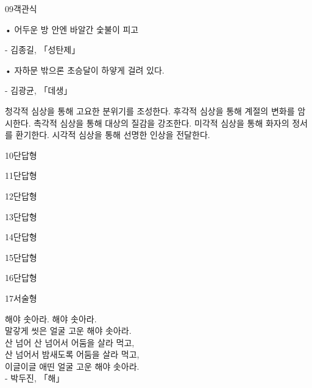 \documentclass[fs9,seriesRus]{korfarm-base}
\begin{document}
\begin{kfQBlock}{09}{객관식}
\begin{kfEvidence}• 어두운 방 안엔 바알간 숯불이 피고

 - 김종길, 「성탄제」

• 자하문 밖으론 초승달이 하얗게 걸려 있다.

 - 김광균, 「데생」\end{kfEvidence}
\begin{kfChoices}
\kfChoice 청각적 심상을 통해 고요한 분위기를 조성한다.
\kfChoice 후각적 심상을 통해 계절의 변화를 암시한다.
\kfChoice 촉각적 심상을 통해 대상의 질감을 강조한다.
\kfChoice 미각적 심상을 통해 화자의 정서를 환기한다.
\kfChoice 시각적 심상을 통해 선명한 인상을 전달한다.
\end{kfChoices}
\end{kfQBlock}
\begin{kfQBlock}{10}{단답형}
\end{kfQBlock}
\begin{kfQBlock}{11}{단답형}
\end{kfQBlock}
\begin{kfQBlock}{12}{단답형}
\end{kfQBlock}
\begin{kfQBlock}{13}{단답형}
\end{kfQBlock}
\begin{kfQBlock}{14}{단답형}
\end{kfQBlock}
\begin{kfQBlock}{15}{단답형}
\end{kfQBlock}
\begin{kfQBlock}{16}{단답형}
\end{kfQBlock}
\begin{kfQBlock}{17}{서술형}
\begin{kfEvidence}해야 솟아라. 해야 솟아라. \\\relax
말갛게 씻은 얼굴 고운 해야 솟아라. \\\relax
산 넘어 산 넘어서 어둠을 살라 먹고, \\\relax
산 넘어서 밤새도록 어둠을 살라 먹고, \\\relax
이글이글 애띤 얼굴 고운 해야 솟아라. \\\relax
- 박두진, 「해」\end{kfEvidence}
\end{kfQBlock}
\kfEndMC
\end{document}
